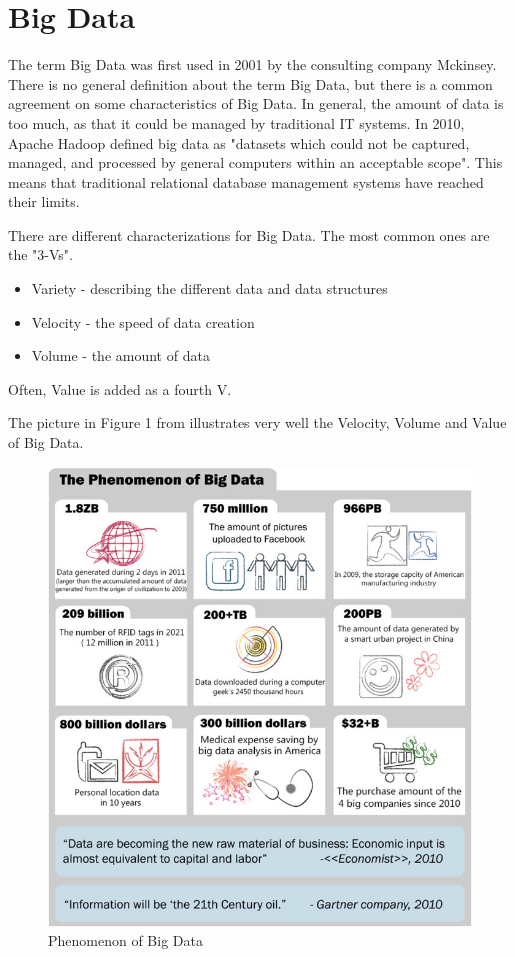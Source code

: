 \documentclass{acm_proc_article-sp}
\begin{document}
\section{Big Data}

The term Big Data was first used in 2001 by the consulting company Mckinsey\cite{DBLP:series/sbcs/ChenMZL14}. There is no general definition about the term Big Data, but there is a common agreement on some characteristics of Big Data. In general, the amount of data is too much, as that it could be managed by traditional IT systems.
In 2010, Apache Hadoop defined big data as "datasets which could not be
captured, managed, and processed by general computers within an acceptable
scope"\cite{DBLP:series/sbcs/ChenMZL14}. This means that traditional relational database management systems have reached their limits.

There are different characterizations for Big Data. The most common ones are the "3-Vs"\cite{bigdata-challenges}.
\begin{itemize}
	\item Variety - describing the different data and data structures
	\item Velocity - the speed of data creation
	\item Volume - the amount of data
\end{itemize}
Often, Value is added as a fourth V.

The picture in Figure 1 from\cite{DBLP:series/sbcs/ChenMZL14} illustrates very well the Velocity, Volume and Value of Big Data.

\begin{figure}[hbtp]
	\centering
	\includegraphics[scale=0.45]{big_data.png}
	\caption{Phenomenon of Big Data\cite{DBLP:series/sbcs/ChenMZL14}}
\end{figure}
\end{document}
